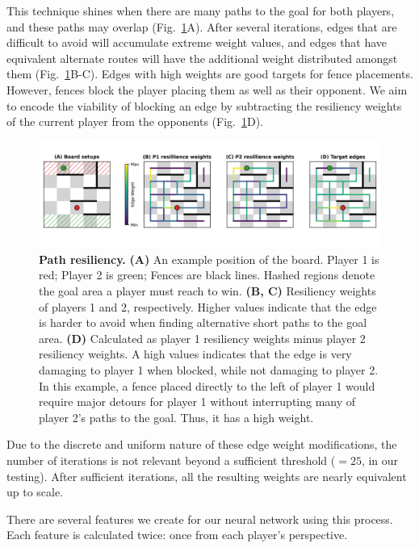 \documentclass[10pt]{article}
\begin{document}
This technique shines when there are many paths to the goal for both players, and these paths may overlap (Fig.~\ref{fig:resiliency}A). After several iterations, edges that are difficult to avoid will accumulate extreme weight values, and edges that have equivalent alternate routes will have the additional weight distributed amongst them (Fig.~\ref{fig:resiliency}B-C). Edges with high weights are good targets for fence placements. However, fences block the player placing them as well as their opponent. We aim to encode the viability of blocking an edge by subtracting the resiliency weights of the current player from the opponents (Fig.~\ref{fig:resiliency}D).

\begin{figure}[H]
    \centering
    \includegraphics[width=\linewidth]{path_figure.png}
    \caption{\textbf{Path resiliency.} \textbf{(A)} An example position of the board. Player 1 is red; Player 2 is green; Fences are black lines. Hashed regions denote the goal area a player must reach to win. \textbf{(B, C)} Resiliency weights of players 1 and 2, respectively. Higher values indicate that the edge is harder to avoid when finding alternative short paths to the goal area. \textbf{(D)} Calculated as player 1 resiliency weights minus player 2 resiliency weights. A high values indicates that the edge is very damaging to player 1 when blocked, while not damaging to player 2. In this example, a fence placed directly to the left of player 1 would require major detours for player 1 without interrupting many of player 2's paths to the goal. Thus, it has a high weight.}
    \label{fig:resiliency}
\end{figure}

Due to the discrete and uniform nature of these edge weight modifications, the number of iterations is not relevant beyond a sufficient threshold ($=25$, in our testing). After sufficient iterations, all the resulting weights are nearly equivalent up to scale.

There are several features we create for our neural network using this process. Each feature is calculated twice: once from each player's perspective.
\end{document}
